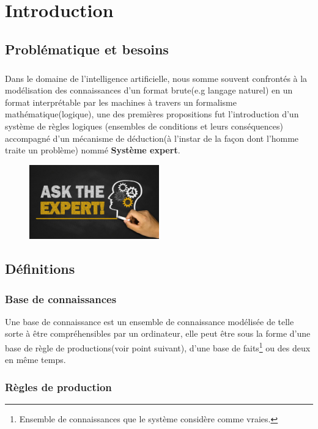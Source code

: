 \chapter{Introduction}
\section{Problématique et besoins}
\paragraph{}
Dans le domaine de l'intelligence artificielle, nous somme souvent confrontés à la modélisation des connaissances d'un format brute(e.g langage naturel) en un format interprétable par les machines à travers un formalisme mathématique(logique), une des premières propositions fut l'introduction d'un système de règles logiques (ensembles de conditions et leurs conséquences) accompagné d'un mécanisme de déduction(à l'instar de la façon dont l'homme traite un problème) nommé \textbf{Système expert}.
\begin{figure}[H]
	\centering
	\includegraphics[width=0.5\textwidth]{imgs/expert.jpg}
	\caption{}
\end{figure}

\newpage

\section{Définitions}
\subsection{Base de connaissances}
Une base de connaissance est un ensemble de connaissance modélisée de telle sorte à être compréhensibles par un ordinateur, elle peut être sous la forme d'une base de règle de productions(voir point suivant), d'une base de faits\footnote{Ensemble de connaissances que le système considère comme vraies.} ou des deux en même temps.
\subsection{Règles de production}
